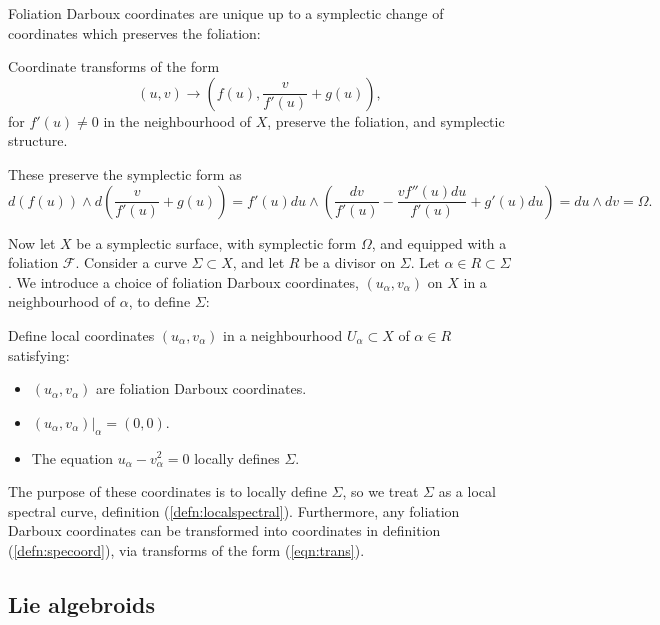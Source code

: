     Foliation Darboux coordinates are unique up to a symplectic change of coordinates which preserves the foliation:
    \begin{lem}
    Coordinate transforms of the form
    \begin{equation}  
    \label{eqn:trans}
        (u,v)\longrightarrow (f(u),\frac{v}{f'(u)}+g(u)),
    \end{equation}
    for \(f'(u)\neq 0\) in the neighbourhood of \(X\), preserve the foliation, and symplectic structure.   
    \end{lem}

    These preserve the symplectic form as \[ d(f(u))\wedge d ( \frac{v}{f'(u)}+g(u) ) = f'(u) du \wedge \left( \frac{dv}{f'(u)} - \frac{ v f''(u) du }{f'(u)} + g'(u) du \right) = d u \wedge dv = \Omega.\]

    Now let \( X\) be a symplectic surface, with symplectic form \( \Omega\), and equipped with a foliation \( \mathcal{F}\). Consider a curve \(\Sigma \subset X\), and let \(R\) be a divisor on \(\Sigma\). Let \(\alpha\in R\subset\Sigma\). We introduce a choice of foliation Darboux coordinates, \( (u_\alpha,v_\alpha)\) on \(X\) in a neighbourhood of \(\alpha\), to define \(\Sigma\):
    
   \begin{defn}  
   \label{defn:specoord}
   Define local coordinates \( (u_\alpha,v_\alpha) \) in a neighbourhood \(U_\alpha \subset X\) of \( \alpha \in R\) satisfying:
   \begin{itemize}
       \item \( (u_{\alpha}, v_{\alpha})\) are foliation Darboux coordinates.
       \item \( (u_\alpha,v_\alpha)|_\alpha=(0,0)\).
       \item The equation \(u_\alpha-v_\alpha^2=0\) locally defines \( \Sigma\).
   \end{itemize}
   \end{defn}
    The purpose of these coordinates is to locally define \( \Sigma\), so we treat \( \Sigma\) as a local spectral curve, definition (\ref{defn:localspectral}). Furthermore, any foliation Darboux coordinates can be transformed into coordinates in definition (\ref{defn:specoord}), via transforms of the form (\ref{eqn:trans}).

    
    
    
    \iffalse 


    \subsection{Lie algebroids}
    
